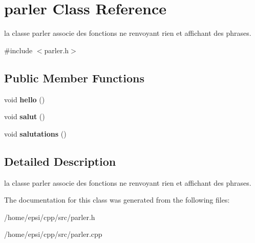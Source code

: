 \hypertarget{classparler}{}\section{parler Class Reference}
\label{classparler}


la classe parler associe des fonctions ne renvoyant rien et affichant des phrases.  




{\ttfamily \#include $<$parler.\+h$>$}

\subsection*{Public Member Functions}
\begin{DoxyCompactItemize}
\item 
\mbox{\label{classparler_ad25d440097a6d50dc72593642fda27a3}} 
void {\bfseries hello} ()
\item 
\mbox{\label{classparler_aae4440bc6916955fab50664180aea610}} 
void {\bfseries salut} ()
\item 
\mbox{\label{classparler_ae053778109f26f52c48b4cd257ce36b5}} 
void {\bfseries salutations} ()
\end{DoxyCompactItemize}


\subsection{Detailed Description}
la classe parler associe des fonctions ne renvoyant rien et affichant des phrases. 

The documentation for this class was generated from the following files\+:\begin{DoxyCompactItemize}
\item 
/home/epsi/cpp/src/parler.\+h\item 
/home/epsi/cpp/src/parler.\+cpp\end{DoxyCompactItemize}
